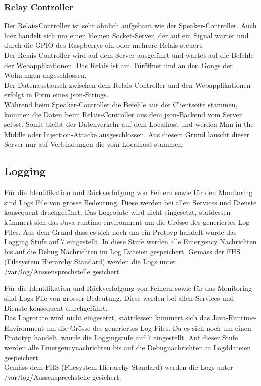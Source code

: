 \subsubsection{Relay Controller}
Der Relais-Controller ist sehr ähnlich aufgebaut wie der Speaker-Controller. Auch hier handelt sich um einen kleinen Socket-Server, der auf ein Signal wartet und durch die GPIO des Raspberrys ein oder mehrere Relais steuert.
\\
Der Relais-Controller wird auf dem Server ausgeführt und wartet auf die Befehle der Webapplikationen. Das Relais ist am Türöffner und an den Gongs der Wohnungen angeschlossen.
\\
Der Datenaustausch zwischen dem Relais-Controller und den Webapplikationen erfolgt in Form eines \gls{json}-Strings.
\\
Während beim Speaker-Controller die Befehle aus der Clientseite stammen, kommen die Daten beim Relais-Controller aus dem \gls{json}-Backend vom Server selbst. Somit bleibt der Datenverkehr auf dem Localhost und werden Man-in-the-Middle oder Injection-Attacke ausgeschlossen. Aus diesem Grund lauscht dieser Server nur auf Verbindungen die vom Localhost stammen.

\subsection{Logging}
\label{kap:logs}
Für die Identifikation und Rückverfolgung von Fehlern sowie für den Monitoring sind Logs File von grosse Bedeutung. Diese werden bei allen Services und Dienste konsequent druchgeführt. Das Logrotate wird nicht eingesetzt, statdessen kümmert sich das Java runtime environment um die Grösse des generiertes Log Files. Aus dem Grund dass es sich noch um ein Protoyp handelt wurde das Logging Stufe auf 7 eingestellt. In diese Stufe werden alle Emergency Nachrichten bis auf die Debug Nachrichten im Log Dateien gespeichert.
Gemäss der FHS (Filesystem Hierarchy Standard) werden die Logs unter /var/log/Aussensprechstelle gesichert. 

Für die Identifikation und Rückverfolgung von Fehlern sowie für das Monitoring sind Logs-File von grosser Bedeutung. Diese werden bei allen Services und Dienste konsequent durchgeführt. 
\\
Das Logrotate wird nicht eingesetzt, stattdessen kümmert sich das Java-Runtime-Environment um die Grösse des generiertes Log-Files.  Da es sich noch um einen Prototyp handelt, wurde die Loggingstufe auf 7 eingestellt. Auf dieser Stufe werden alle Emergencynachrichten bis auf die Debugnachrichten in Logddateien gespeichert. 
\\
Gemäss dem FHS (Filesystem Hierarchy Standard) werden die Logs unter /var/log/Aussensprechstelle gesichert.

